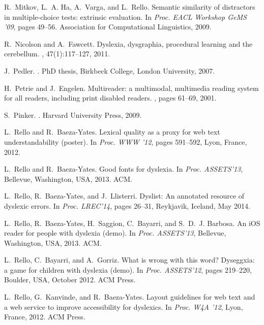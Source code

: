 \documentclass[letterpaper]{sig-alternate-2013}
\begin{document}
\begin{thebibliography}{10}
R.~Mitkov, L.~A. Ha, A.~Varga, and L.~Rello.
\newblock Semantic similarity of distractors in multiple-choice tests:
  extrinsic evaluation.
\newblock In {\em Proc. EACL Workshop GeMS '09}, pages 49--56. Association for
  Computational Linguistics, 2009.

R.~Nicolson and A.~Fawcett.
\newblock Dyslexia, dysgraphia, procedural learning and the cerebellum.
, 47(1):117--127, 2011.

J.~Pedler.
.
\newblock PhD thesis, {Birkbeck College, London University}, 2007.

H.~Petrie and J.~Engelen.
\newblock Multireader: a multimodal, multimedia reading system for all readers,
  including print disabled readers.
, pages
  61--69, 2001.

S.~Pinker.
.
\newblock Harvard University Press, 2009.

\vfill\eject

L.~Rello and R.~Baeza-Yates.
\newblock Lexical quality as a proxy for web text understandability (poster).
\newblock In {\em Proc. WWW '12}, pages 591--592, Lyon, France, 2012.



L.~Rello and R.~Baeza-Yates.
\newblock Good fonts for dyslexia.
\newblock In {\em Proc. ASSETS'13}, Bellevue, Washington, USA, 2013. ACM.

L.~Rello, R.~Baeza-Yates, and J.~Llisterri.
\newblock Dyslist: An annotated resource of dyslexic errors.
\newblock In {\em Proc. LREC'14}, pages 26--31, Reykjavik, Iceland, May 2014.

L.~Rello, R.~Baeza-Yates, H.~Saggion, C.~Bayarri, and S.~D.~J. Barbosa.
\newblock An {iOS} reader for people with dyslexia (demo).
\newblock In {\em Proc. ASSETS'13}, Bellevue, Washington, USA, 2013. ACM.

L.~Rello, C.~Bayarri, and A.~Gorriz.
\newblock What is wrong with this word? {D}yseggxia: a game for children with
  dyslexia (demo).
\newblock In {\em Proc. ASSETS'12}, pages 219--220, Boulder, USA, October 2012.
  ACM Press.

L.~Rello, G.~Kanvinde, and R.~Baeza-Yates.
\newblock Layout guidelines for web text and a web service to improve
  accessibility for dyslexics.
\newblock In {\em Proc. W4A '12}, Lyon, France, 2012. ACM Press.


\end{thebibliography}
\end{document}
